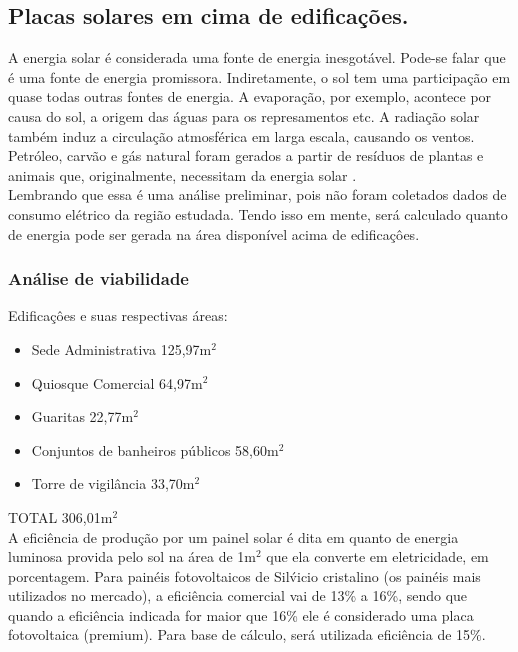 \subsection{Placas solares em cima de edifica\c{c}\~oes.}

 A energia solar \'e considerada uma fonte de energia inesgot\'avel. Pode-se falar que \'e uma fonte de energia promissora. Indiretamente, o sol tem uma participa\c{c}\~ao em quase todas outras fontes de energia. A evapora\c{c}\~ao, por exemplo, acontece por causa do sol, a origem das \'aguas para os represamentos etc. A radia\c{c}\~ao solar tamb\'em induz a circula\c{c}\~ao atmosf\'erica em larga escala, causando os ventos. Petr\'oleo, carv\~ao e g\'as natural foram gerados a partir de res\'iduos de plantas e animais que, originalmente, necessitam da energia solar \cite{CRESESB}. \\ 
 
 Lembrando que essa \'e uma an\'alise preliminar, pois n\~ao foram coletados dados de consumo el\'etrico da regi\~ao estudada. Tendo isso em mente, ser\'a calculado quanto de energia pode ser gerada na \'area dispon\'ivel acima de edifica\c{c}\^oes. 
 
 \subsubsection{An\'alise de viabilidade}
 
 Edifica\c{c}\^oes e suas respectivas \'areas:
 
 \begin{itemize}
        \item Sede Administrativa			125,97m$^{2}$
	\item Quiosque Comercial			64,97m$^{2}$
	\item Guaritas				22,77m$^{2}$
	\item Conjuntos de banheiros p\'ublicos	58,60m$^{2}$
	\item Torre de vigil\^ancia			33,70m$^{2}$
\end{itemize}

TOTAL					306,01m$^{2}$\\

A efici\^encia de produ\c{c}\~ao por um painel solar \'e dita em quanto de energia luminosa provida pelo sol na \'area de 1m$^{2}$ que ela converte em eletricidade, em porcentagem. Para pain\'eis fotovoltaicos de Sil\'vicio cristalino (os pain\'eis mais utilizados no mercado), a efici\^encia comercial vai de 13\% a 16\%, sendo que quando a efici\^encia indicada for maior que 16\% ele \'e considerado uma placa fotovoltaica (premium). Para base de c\'alculo, ser\'a utilizada efici\^encia de 15\%. \\

